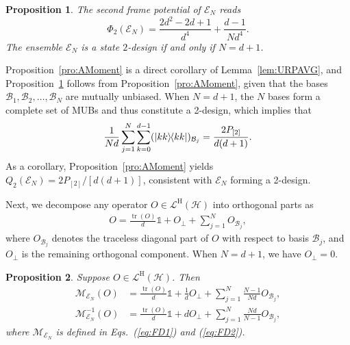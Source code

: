 \documentclass[aps,pra,twocolumn,nofootinbib,superscriptaddress,10pt]{revtex4-2}
\newtheorem{proposition}{Proposition}
\DeclarePairedDelimiter{\ket}{\lvert}{\rangle}
\DeclarePairedDelimiter{\bra}{\langle}{\rvert}
\newcommand{\ketbra}[2]{\ket{#1}\mkern-2mu\bra{#2}}
\newcommand{\proj}[1]{\ketbra{#1}{#1}}
\DeclareMathOperator{\tr}{tr}
\newcommand{\bbone}{\mathds{1}}
\newcommand{\caB}{\mathcal{B}}
\newcommand{\caE}{\mathcal{E}}
\newcommand{\caH}{\mathcal{H}}
\newcommand{\caL}{\mathcal{L}}
\newcommand{\caM}{\mathcal{M}}
\newcommand{\rmH}{\mathrm{H}}
\newcommand{\eqsref}[2]{Eqs.~(\ref{#1}) and (\ref{#2})}
\newcommand{\lref}[1]{Lemma~\ref{#1}}
\newcommand{\pref}[1]{Proposition~\ref{#1}}
\newcommand{\Pref}[1]{Proposition~\ref{#1}}
\begin{document}
\begin{proposition}\label{pro:AN2design}
The second frame potential of $\caE_N$ reads
\begin{equation}
    \Phi_2(\caE_N)=\frac{2d^2-2d+1}{d^4}+\frac{d-1}{Nd^4}.
\end{equation}
The ensemble $\caE_N$ is a state $2$-design if and only if $N=d+1$.
\end{proposition}

\Pref{pro:AMoment} is a direct corollary of \lref{lem:URPAVG}, and \pref{pro:AN2design} follows 
from \pref{pro:AMoment},
 given that the bases $\caB_1, \caB_2, \ldots, \caB_N$ are mutually unbiased. When $N = d+1$, the $N$ bases form a complete set of MUBs and thus constitute a 2-design, which implies that
\begin{equation}
\frac{1}{Nd}\sum_{j=1}^{N}\sum_{k=0}^{d-1}(\proj{kk})_{\caB_j} = \frac{2P_{[2]}}{d(d+1)}.
\end{equation}
As a corollary, \pref{pro:AMoment} yields $Q_2(\caE_N) = 2P_{[2]}/[d(d+1)]$, consistent with $\caE_N$ forming a 2-design.



Next, we decompose any operator $O \in \caL^{\rmH}(\caH)$ into orthogonal parts as
\begin{align}
O =\frac{\tr(O)}{d}\bbone+O_{\perp}+ \sum_{j=1}^{N} O_{\caB_j} ,
\end{align}
where $O_{\caB_j}$ denotes the traceless diagonal part of $O$ with respect to basis $\caB_j$, and $O_{\perp}$ is the remaining orthogonal component. When $N=d+1$, we have $O_{\perp}=0$.
\begin{proposition}\label{pro:caFA}
Suppose $O\in \caL^{\rmH}(\caH)$. Then
\begin{align}
    \caM_{\caE_N}(O) &= \frac{\tr(O)}{d}\bbone+\frac{1}{d}O_{\perp} + 
    \sum_{j=1}^{N}\frac{N-1}{Nd}O_{\caB_j}, \label{eq:caMcaE_N}\\
\caM^{-1}_{\caE_N}(O) &= \frac{\tr(O)}{d}\bbone+dO_{\perp} +\sum_{j=1}^{N}\frac{Nd}{N-1}O_{\caB_j}, \label{eq:caMcaE_Ninv}
\end{align}
where $\caM_{\caE_N}$ is defined in \eqsref{eq:FD1}{eq:FD2}.
\end{proposition}
\end{document}
